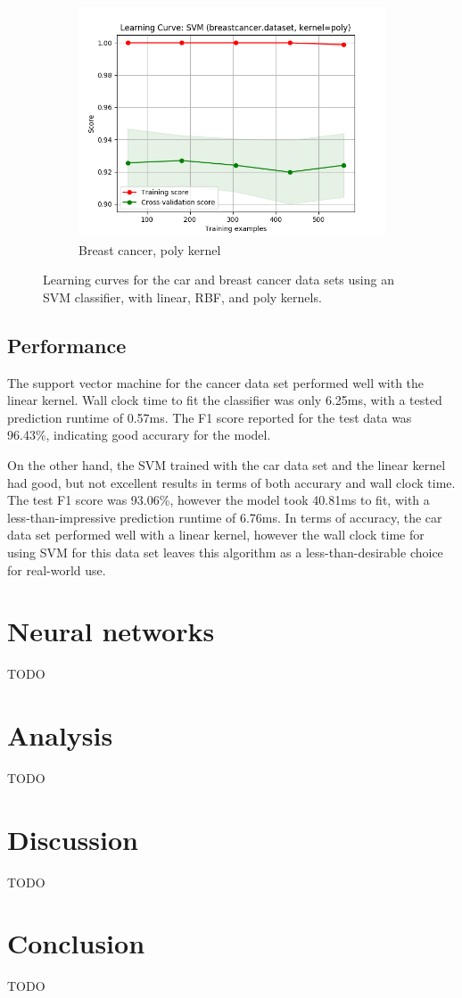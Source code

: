 \documentclass{article}
\begin{document}
\begin{figure}[htb]
\begin{subfigure}{0.33\textwidth}
      \includegraphics[width=\linewidth]{out/svm/breastcancer-kernel-poly.png}
      \caption{Breast cancer, poly kernel}
      \label{fig:svm-learning-6}
    \end{subfigure}

    \caption{Learning curves for the car and breast cancer data sets using an SVM classifier, with linear, RBF, and poly kernels.}
    \label{fig:svm-learning}
    \end{figure}

    \subsection{Performance}
    The support vector machine for the cancer data set performed well with the linear kernel. Wall clock time to fit the classifier was only 6.25ms, with a tested prediction runtime of 0.57ms. The F1 score reported for the test data was 96.43\%, indicating good accurary for the model.

    On the other hand, the SVM trained with the car data set and the linear kernel had good, but not excellent results in terms of both accurary and wall clock time. The test F1 score was 93.06\%, however the model took 40.81ms to fit, with a less-than-impressive prediction runtime of 6.76ms. In terms of accuracy, the car data set performed well with a linear kernel, however the wall clock time for using SVM for this data set leaves this algorithm as a less-than-desirable choice for real-world use.

    \section{Neural networks}
    TODO

    \section{Analysis}
    TODO

    \section{Discussion}
    TODO

    \section{Conclusion}
    TODO
\end{document}
